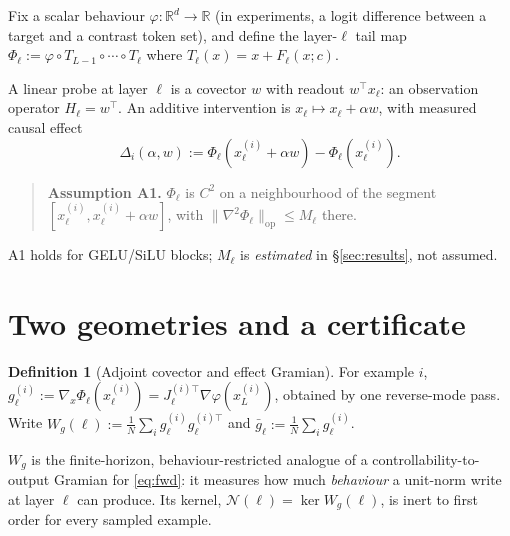 \documentclass[11pt]{article}
\theoremstyle{definition}
\newtheorem{definition}{Definition}
\theoremstyle{remark}
\newcommand{\gbar}{\bar{g}}
\newcommand{\Wg}{W_{g}}
\begin{document}
Fix a scalar behaviour $\varphi:\mathbb{R}^d\to\mathbb{R}$ (in experiments, a
logit difference between a target and a contrast token set), and define the
layer-$\ell$ tail map
$\Phi_\ell := \varphi \circ T_{L-1}\circ\cdots\circ T_\ell$ where
$T_\ell(x)=x+F_\ell(x;c)$.

A linear probe at layer $\ell$ is a covector $w$ with readout $w^\top x_\ell$:
an observation operator $H_\ell=w^\top$. An additive intervention is
$x_\ell \mapsto x_\ell + \alpha w$, with measured causal effect
\begin{equation}
\Delta_i(\alpha,w) := \Phi_\ell\!\left(x_\ell^{(i)}+\alpha w\right)-\Phi_\ell\!\left(x_\ell^{(i)}\right).
\label{eq:effect}
\end{equation}

\begin{quote}
\textbf{Assumption A1.} $\Phi_\ell$ is $C^2$ on a neighbourhood of the segment
$[x_\ell^{(i)},x_\ell^{(i)}+\alpha w]$, with $\|\nabla^2\Phi_\ell\|_{\mathrm{op}}\le M_\ell$ there.
\end{quote}

A1 holds for GELU/SiLU blocks; $M_\ell$ is \emph{estimated} in
\S\ref{sec:results}, not assumed.

\section{Two geometries and a certificate}
\label{sec:two}

\begin{definition}[Adjoint covector and effect Gramian]
For example $i$, $g_\ell^{(i)} := \nabla_x\Phi_\ell(x_\ell^{(i)}) = J_\ell^{(i)\top}\nabla\varphi(x_L^{(i)})$,
obtained by one reverse-mode pass. Write
$\Wg(\ell) := \tfrac1N\sum_i g_\ell^{(i)}g_\ell^{(i)\top}$ and
$\gbar_\ell := \tfrac1N\sum_i g_\ell^{(i)}$.
\end{definition}

$\Wg$ is the finite-horizon, behaviour-restricted analogue of a
controllability-to-output Gramian for \eqref{eq:fwd}: it measures how much
\emph{behaviour} a unit-norm write at layer $\ell$ can produce. Its kernel,
$\mathcal{N}(\ell)=\ker\Wg(\ell)$, is inert to first order for every sampled example.
\end{document}
